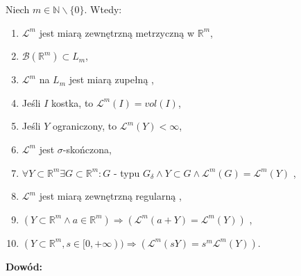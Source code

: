 \begin{tw}
    Niech $m \in \mathbb{N} \backslash \{0\}$. Wtedy:
    \begin{enumerate}
    \item $\mathcal{L}^m$ jest miarą zewnętrzną metrzyczną w $\mathbb{R}^m$,
    \item $\mathcal{B}(\mathbb{R}^m) \subset L_m$,
    \item $\mathcal{L}^m$ na $L_m$ jest miarą zupełną ,
    \item Jeśli $I$ kostka, to $\mathcal{L}^m(I) = vol(I)$,
    \item Jeśli $Y$ ograniczony, to $\mathcal{L}^m(Y) < \infty$,
    \item $\mathcal{L}^m$ jest $\sigma$-skończona,
    \item $\forall Y \subset \mathbb{R}^m \exists G \subset \mathbb{R}^m: G$ - typu $G_{\delta} \wedge Y \subset G \wedge \mathcal{L}^m(G) = \mathcal{L}^m(Y)$ ,
    \item $\mathcal{L}^m$ jest miarą zewnętrzną regularną ,
    \item $(Y \subset \mathbb{R}^m \wedge a \in \mathbb{R}^m) \Longrightarrow (\mathcal{L}^m(a + Y) = \mathcal{L}^m(Y))$ ,
    \item $(Y \subset \mathbb{R}^m, s \in [0, +\infty)) \Longrightarrow (\mathcal{L}^m(sY) = s^m\mathcal{L}^m(Y))$.
    \end{enumerate}

    \textbf{Dowód:} \citep[3.41]{Tworzewski}
\end{tw}